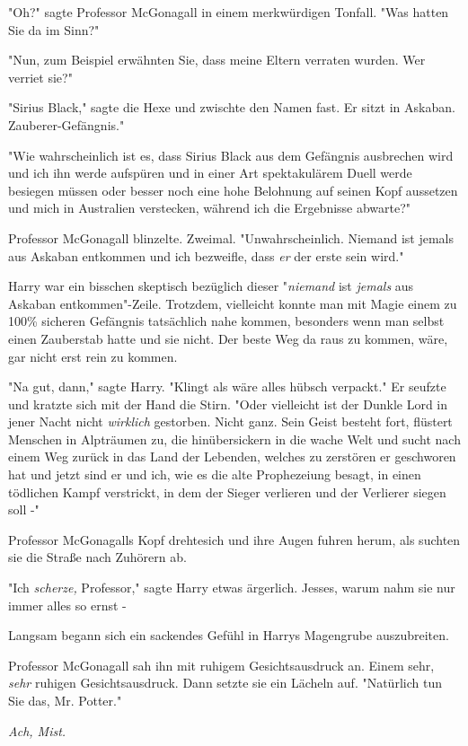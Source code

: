 {"Oh?" sagte Professor McGonagall in einem merkwürdigen Tonfall. "Was hatten Sie da im Sinn?"

"Nun, zum Beispiel erwähnten Sie, dass meine Eltern verraten wurden. Wer verriet sie?"

"Sirius Black," sagte die Hexe und zwischte den Namen fast. Er sitzt in Askaban. Zauberer-Gefängnis."

"Wie wahrscheinlich ist es, dass Sirius Black aus dem Gefängnis ausbrechen wird und ich ihn werde aufspüren und in einer Art spektakulärem Duell werde besiegen müssen oder besser noch eine hohe Belohnung auf seinen Kopf aussetzen und mich in Australien verstecken, während ich die Ergebnisse abwarte?"

Professor McGonagall blinzelte. Zweimal. "Unwahrscheinlich. Niemand ist jemals aus Askaban entkommen und ich bezweifle, dass \emph{er} der erste sein wird."

Harry war ein bisschen skeptisch bezüglich dieser "\emph{niemand} ist \emph{jemals} aus Askaban entkommen"-Zeile. Trotzdem, vielleicht konnte man mit Magie einem zu 100\% sicheren Gefängnis tatsächlich nahe kommen, besonders wenn man selbst einen Zauberstab hatte und sie nicht. Der beste Weg da raus zu kommen, wäre, gar nicht erst rein zu kommen.

"Na gut, dann," sagte Harry. "Klingt als wäre alles hübsch verpackt." Er seufzte und kratzte sich mit der Hand die Stirn. "Oder vielleicht ist der Dunkle Lord in jener Nacht nicht \emph{wirklich} gestorben. Nicht ganz. Sein Geist besteht fort, flüstert Menschen in Alpträumen zu, die hinübersickern in die wache Welt und sucht nach einem Weg zurück in das Land der Lebenden, welches zu zerstören er geschworen hat und jetzt sind er und ich, wie es die alte Prophezeiung besagt, in einen tödlichen Kampf verstrickt, in dem der Sieger verlieren und der Verlierer siegen soll -"

Professor McGonagalls Kopf drehtesich und ihre Augen fuhren herum, als suchten sie die Straße nach Zuhörern ab.

"Ich \emph{scherze,} Professor," sagte Harry etwas ärgerlich. Jesses, warum nahm sie nur immer alles so ernst -

Langsam begann sich ein sackendes Gefühl in Harrys Magengrube auszubreiten.

Professor McGonagall sah ihn mit ruhigem Gesichtsausdruck an. Einem sehr, \emph{sehr} ruhigen Gesichtsausdruck. Dann setzte sie ein Lächeln auf. "Natürlich tun Sie das, Mr. Potter."

\emph{Ach, Mist.}

}
